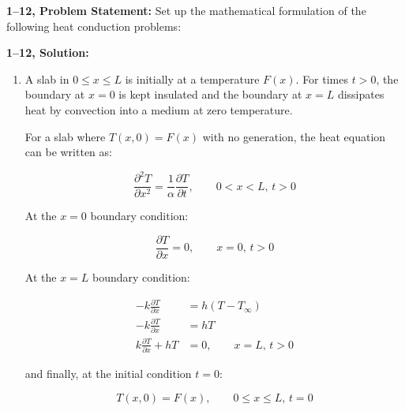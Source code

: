 \documentclass[letterpaper,12pt]{article}
\begin{document}

\textbf{1--12, Problem Statement:}
Set up the mathematical formulation of the following heat conduction problems:

\vspace{6pt}

\textbf{1--12, Solution:}

\begin{enumerate}
    \item A slab in $0 \leq x \leq L$ is initially at a temperature $F\left( x \right)$. For times $t > 0$, the boundary at $x = 0$ is kept insulated and the boundary at $x = L$ dissipates heat by convection into a medium at zero temperature.
    
    For a slab where $T(x, 0) = F(x)$ with no generation, the heat equation can be written as:

    \begin{equation}
    \frac{\partial^2 T}{\partial x^2} = \frac{1}{\alpha} \frac{\partial T}{\partial t}, \qquad 0 < x < L, \, t > 0
    \end{equation}

    At the $x = 0$ boundary condition:

    \begin{equation}
        \frac{\partial T}{\partial x} = 0, \qquad x = 0, \, t > 0
    \end{equation}

    At the $x = L$ boundary condition:

    \begin{equation}
    \begin{aligned}
        -k\frac{\partial T}{\partial x}      &= h(T - T_{\infty}) \\
        -k\frac{\partial T}{\partial x}      &= hT \\
         k\frac{\partial T}{\partial x} + hT &= 0 , \qquad x = L, \, t > 0
    \end{aligned}
    \end{equation}

    and finally, at the initial condition $t = 0$:

    \begin{equation}
        T(x, 0) = F(x), \qquad 0 \leq x \leq L, \, t = 0 
    \end{equation}
    


\end{enumerate}
\end{document}
